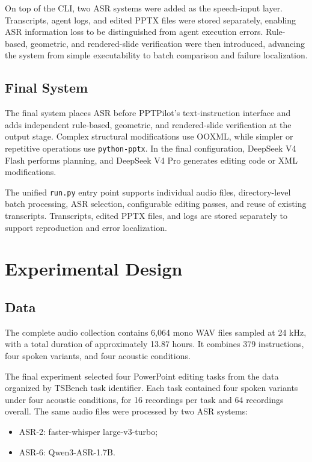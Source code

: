 \documentclass[11pt,a4paper,UTF8,fontset=fandol]{ctexart}
\begin{document}
On top of the CLI, two ASR systems were added as the speech-input layer. Transcripts, agent logs, and edited PPTX files were stored separately, enabling ASR information loss to be distinguished from agent execution errors. Rule-based, geometric, and rendered-slide verification were then introduced, advancing the system from simple executability to batch comparison and failure localization.

\subsection{Final System}

The final system places ASR before PPTPilot's text-instruction interface and adds independent rule-based, geometric, and rendered-slide verification at the output stage. Complex structural modifications use OOXML, while simpler or repetitive operations use \texttt{python-pptx}. In the final configuration, DeepSeek V4 Flash performs planning, and DeepSeek V4 Pro generates editing code or XML modifications.

The unified \texttt{run.py} entry point supports individual audio files, directory-level batch processing, ASR selection, configurable editing passes, and reuse of existing transcripts. Transcripts, edited PPTX files, and logs are stored separately to support reproduction and error localization.

\section{Experimental Design}

\subsection{Data}

The complete audio collection contains 6,064 mono WAV files sampled at 24 kHz, with a total duration of approximately 13.87 hours. It combines 379 instructions, four spoken variants, and four acoustic conditions.

The final experiment selected four PowerPoint editing tasks from the data organized by TSBench task identifier. Each task contained four spoken variants under four acoustic conditions, for 16 recordings per task and 64 recordings overall. The same audio files were processed by two ASR systems:

\begin{itemize}
  \item ASR-2: faster-whisper large-v3-turbo;
  \item ASR-6: Qwen3-ASR-1.7B.
\end{itemize}
\end{document}
